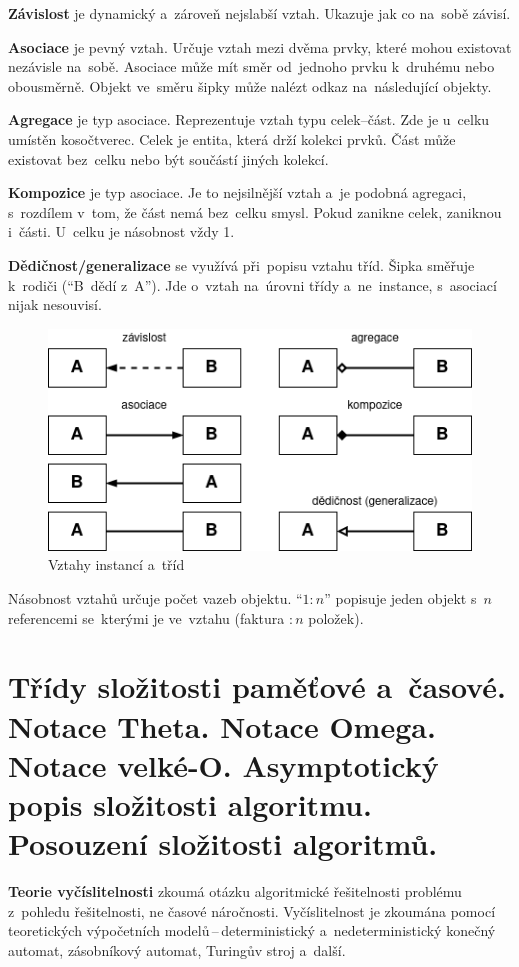 \textbf{Závislost} je dynamický a~zároveň nejslabší vztah. Ukazuje jak co na~sobě závisí.

\textbf{Asociace} je pevný vztah. Určuje vztah mezi dvěma prvky, které mohou existovat nezávisle na~sobě. Asociace může mít směr od~jednoho prvku k~druhému nebo obousměrně. Objekt ve~směru šipky může nalézt odkaz na~následující objekty.

\textbf{Agregace} je typ asociace. Reprezentuje vztah typu celek--část. Zde je u~celku umístěn kosočtverec. Celek je entita, která drží kolekci prvků. Část může existovat bez~celku nebo být součástí jiných kolekcí.

\textbf{Kompozice} je typ asociace. Je to nejsilnější vztah a~je podobná agregaci, s~rozdílem v~tom, že část nemá bez~celku smysl. Pokud zanikne celek, zaniknou i~části. U~celku je násobnost vždy 1.

\textbf{Dědičnost/generalizace} se využívá při~popisu vztahu tříd. Šipka směřuje k~rodiči (\enquote{B~dědí z~A}). Jde o~vztah na~úrovni třídy a~ne~instance, s~asociací nijak nesouvisí.

\begin{figure}[ht]
	\centering
	\includegraphics[scale=0.8]{images/vztahy-trid}
	\caption{Vztahy instancí a~tříd}
\end{figure}

Násobnost vztahů určuje počet vazeb objektu. \enquote{$1:n$} popisuje jeden objekt s~$n$ referencemi se~kterými je ve~vztahu (faktura $:n$ položek).

\clearpage
\section{Třídy složitosti paměťové a~časové. Notace Theta. Notace Omega. Notace velké-O. Asymptotický popis složitosti algoritmu. Posouzení složitosti algoritmů.}

\textbf{Teorie vyčíslitelnosti} zkoumá otázku algoritmické řešitelnosti problému z~pohledu řešitelnosti, ne časové náročnosti. Vyčíslitelnost je zkoumána pomocí teoretických výpočetních modelů\,--\,deterministický a~nedeterministický konečný automat, zásobníkový automat, Turingův stroj a~další.


